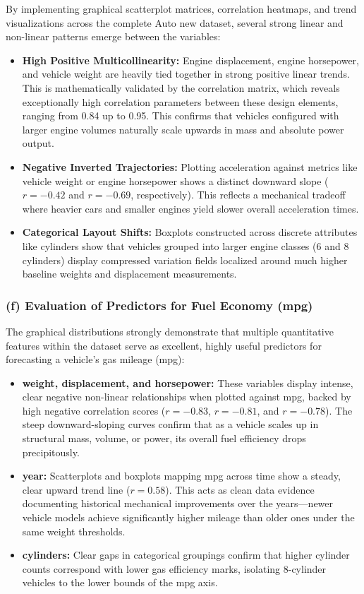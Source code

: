 \documentclass[12pt,a4paper]{article}
\begin{document}
By implementing graphical scatterplot matrices, correlation heatmaps, and trend visualizations across the complete Auto new dataset, several strong linear and non-linear patterns emerge between the variables:

\begin{itemize}
\item \textbf{High Positive Multicollinearity:} Engine displacement, engine horsepower, and vehicle weight are heavily tied together in strong positive linear trends. This is mathematically validated by the correlation matrix, which reveals exceptionally high correlation parameters between these design elements, ranging from 0.84 up to 0.95. This confirms that vehicles configured with larger engine volumes naturally scale upwards in mass and absolute power output.
\item \textbf{Negative Inverted Trajectories:} Plotting acceleration against metrics like vehicle weight or engine horsepower shows a distinct downward slope ($r=-0.42$ and $r=-0.69$, respectively). This reflects a mechanical tradeoff where heavier cars and smaller engines yield slower overall acceleration times.
\item \textbf{Categorical Layout Shifts:} Boxplots constructed across discrete attributes like cylinders show that vehicles grouped into larger engine classes (6 and 8 cylinders) display compressed variation fields localized around much higher baseline weights and displacement measurements.
\end{itemize}

\subsubsection*{(f) Evaluation of Predictors for Fuel Economy (mpg)}

The graphical distributions strongly demonstrate that multiple quantitative features within the dataset serve as excellent, highly useful predictors for forecasting a vehicle's gas mileage (mpg):

\begin{itemize}
\item \textbf{weight, displacement, and horsepower:} These variables display intense, clear negative non-linear relationships when plotted against mpg, backed by high negative correlation scores ($r=-0.83$, $r=-0.81$, and $r=-0.78$). The steep downward-sloping curves confirm that as a vehicle scales up in structural mass, volume, or power, its overall fuel efficiency drops precipitously.
\item \textbf{year:} Scatterplots and boxplots mapping mpg across time show a steady, clear upward trend line ($r=0.58$). This acts as clean data evidence documenting historical mechanical improvements over the years---newer vehicle models achieve significantly higher mileage than older ones under the same weight thresholds.
\item \textbf{cylinders:} Clear gaps in categorical groupings confirm that higher cylinder counts correspond with lower gas efficiency marks, isolating 8-cylinder vehicles to the lower bounds of the mpg axis.
\end{itemize}
\end{document}
